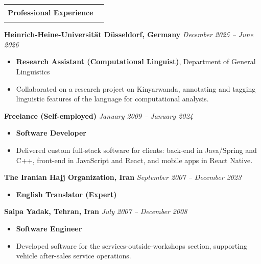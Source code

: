 \documentclass[11pt,a4paper]{article}
\makeatletter
\newcommand{\inlinesection}[1]{%
  \vspace{1em}
  \noindent
  \begin{tabular*}{\linewidth}{@{}l@{\extracolsep{\fill}}r@{}}
    \Large\textbf{\color{darkblue} #1} & \color{darkblue}\rule{0.7\linewidth}{1.2pt} \\
  \end{tabular*}
  \par\vspace{0.7em}
}
\makeatother
\begin{document}
\inlinesection{Professional Experience}
\begin{list}{}{
  \setlength{\leftmargin}{0pt}
  \setlength{\labelwidth}{0pt}
  \setlength{\itemindent}{0pt}
  \setlength{\parsep}{0pt}
  \setlength{\itemsep}{1em}
}
\item \textcolor{RedViolet}{\textbf{Heinrich-Heine-Universität Düsseldorf, Germany} \hfill \textit{December 2025 – June 2026}} \vspace{0.5em}
      \begin{itemize}
          \item \textbf{Research Assistant (Computational Linguist)}, Department of General Linguistics
          \item Collaborated on a research project on Kinyarwanda, annotating and tagging linguistic features of the language for computational analysis.
      \end{itemize}

\item \textcolor{RedViolet}{\textbf{Freelance (Self-employed)} \hfill \textit{January 2009 – January 2024}} \vspace{0.5em}
      \begin{itemize}
          \item \textbf{Software Developer}
          \item Delivered custom full-stack software for clients: back-end in Java/Spring and C++, front-end in JavaScript and React, and mobile apps in React Native.
      \end{itemize}

\item \textcolor{RedViolet}{\textbf{The Iranian Hajj Organization, Iran} \hfill \textit{September 2007 – December 2023}} \vspace{0.5em}
      \begin{itemize}
          \item \textbf{English Translator (Expert)}
      \end{itemize}

\item \textcolor{RedViolet}{\textbf{Saipa Yadak, Tehran, Iran} \hfill \textit{July 2007 – December 2008}} \vspace{0.5em}
      \begin{itemize}
          \item \textbf{Software Engineer}
          \item Developed software for the services-outside-workshops section, supporting vehicle after-sales service operations.
      \end{itemize}


\end{list}
\end{document}
